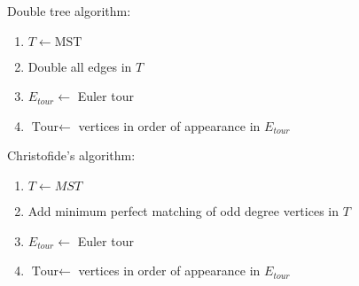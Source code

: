 \documentclass[smaller,aspectratio=169,ignorenonframetext,compress,sans,fleqn,xcolor=dvipsnames,fleqn,table,stillsansserifmath,stillsansseriftext,stillsansserifsmall,stillsansseriflarge]{beamer}
\begin{document}
\begin{frame}
\begin{framed}
Double tree algorithm:
\medskip
\begin{enumerate}
\item $T\leftarrow \text{MST}$
\item {\color{red} Double all edges} in $T$
\item  $E_{tour} \leftarrow$ Euler tour
\item $\text{Tour}\leftarrow$ vertices in order of appearance in $E_{tour}$
\end{enumerate}
\end{framed}

\bigskip

\begin{framed}
  \medskip
  Christofide's algorithm:
\begin{enumerate}
\item $T\leftarrow MST$
\item  Add {\color{red} minimum perfect matching} of odd degree vertices in
  $T$
\item $E_{tour}\leftarrow$ Euler tour
\item $\text{Tour} \leftarrow $ vertices in order of appearance in $E_{tour}$
\end{enumerate}
\end{framed}
\end{frame}
\end{document}
